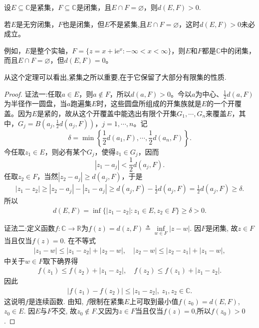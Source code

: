 \documentclass[../../main.tex]{subfiles}%
\begin{document}
\begin{theorem}\label{theorem:紧集和闭集无交则距离大于0}
设\(E\subseteq \mathbb{C}\)是紧集，\(F\subseteq \mathbb{C}\)是闭集，且\(E \cap F = \varnothing\)，则$d(E, F) > 0.$
\end{theorem}
\begin{remark}
若\(E\)是无穷闭集，\(F\)也是闭集，但$E$不是紧集,且\(E \cap F = \varnothing\)，这时\(d(E, F) > 0\)未必成立。

例如，\(E\)是整个实轴，\(F = \{ z = x + \mathrm{i}\mathrm{e}^x : -\infty < x < \infty \}\)，则\(E\)和\(F\)都是\(\mathbb{C}\)中的闭集，而且\(E \cap F = \varnothing\)，但\(d(E, F) = 0\)。
\end{remark}
\begin{note}
从这个定理可以看出,紧集之所以重要,在于它保留了大部分有限集的性质.
\end{note}
\begin{proof}

{\color{blue}证法一:}任取\(a \in E\)，则\(a \notin F\)，所以\(d(a, F) > 0\)。今以\(a\)为中心、\(\frac{1}{2}d(a, F)\)为半径作一圆盘，当\(a\)跑遍集\(E\)时，这些圆盘所组成的开集族就是\(E\)的一个开覆盖。因为\(E\)是紧的，故从这个开覆盖中能选出有限个开集\(G_1, \cdots, G_n\)来覆盖\(E\)，其中，\(G_j = B\left( a_j, \frac{1}{2}d(a_j, F) \right)\)，\(j = 1, \cdots, n\)。记
\[
\delta = \min\left\{ \frac{1}{2}d(a_1, F), \cdots, \frac{1}{2}d(a_n, F) \right\}.
\]
今任取\(z_1 \in E\)，则必有某个\(G_j\)，使得\(z_1 \in G_j\)，因而
\[
| z_1 - a_j | < \frac{1}{2}d(a_j, F).
\]
任取\(z_2 \in F\)，当然\(| z_2 - a_j | \geqslant d(a_j, F)\)，于是
\[
\begin{split}
| z_1 - z_2 | \geqslant | z_2 - a_j | - | z_1 - a_j | \geqslant d(a_j, F) - \frac{1}{2}d(a_j, F) = \frac{1}{2}d(a_j, F) \geqslant \delta.
\end{split}
\]
所以
\[
\begin{split}
d(E, F) = \inf\{ | z_1 - z_2 | : z_1 \in E, z_2 \in F \}  \geqslant \delta > 0.
\end{split}
\] 

{\color{blue}证法二:}定义函数$f:\mathbb{C}\to\mathbb{R}$为$f(z)=d(z,F)\triangleq \inf\limits_{w\in F}|z-w|$. 因$F$是闭集, 故$z\in F$当且仅当$f(z)=0$. 在不等式
\begin{align*}
|z_1-w|\leqslant |z_1-z_2|+|z_2-w|,\quad |z_2-w|\leqslant |z_2-z_1|+|z_1-w|,
\end{align*}
中关于$w\in F$取下确界得
\begin{align*}
f(z_1)\leqslant f(z_2)+|z_1-z_2|,\quad f(z_2)\leqslant f(z_1)+|z_1-z_2|.
\end{align*}
因此
\begin{align*}
|f(z_1)-f(z_2)|\leqslant|z_1-z_2|,\ z_1,z_2\in\mathbb{C}.
\end{align*}
这说明$f$是连续函数. 由知, $f$限制在紧集$E$上可取到最小值$f(z_0)=d(E,F)$, $z_0\in E$. 因$E$与$F$不交, 故$z_0\notin F$.又因为$z\in F$当且仅当$f(z)=0$,所以$f(z_0)>0$.
\end{proof}
\end{document}
